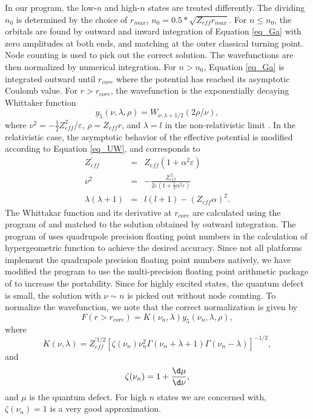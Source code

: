 \documentclass{elsart}
\begin{document}
In our program, the low-$n$ and high-$n$ states are treated differently.
The dividing $n_0$ is determined by the choice of $r_{max}$, $n_0 =
0.5*\sqrt{Z_{eff}r_{max}}$. For $n \le n_0$, the orbitals are found by outward
and inward integration of Equation \ref{eq_Ga} with zero amplitudes at both
ends, 
and matching at the outer classical turning point. Node counting is used to
pick out the correct solution. The wavefunctions are then normalized by
numerical integration. For $n > n_0$, Equation \ref{eq_Ga} is integrated
outward until $r_{core}$ where the potential has reached its asymptotic
Coulomb value. For $r > r_{core}$, the wavefunction is the exponentially
decaying Whittaker function 
\begin{equation}
y_5(\nu, \lambda, \rho) = W_{\nu, \lambda+1/2}(2\rho/\nu),
\end{equation}
where $\nu^2 = -\frac{1}{2}Z_{eff}^2/\varepsilon$, $\rho = Z_{eff}r$, and
$\lambda = l$ in the non-relativistic limit \citep{seaton58}. In the
relativistic case, the asymptotic behavior of the effective potential is
modified according to Equation \ref{eq_UW}, and corresponds to 
\begin{eqnarray}
Z_{eff}^\prime &=& Z_{eff}(1+\alpha^2\varepsilon) \nonumber\\
\nu^2 &=& -\frac{Z_{eff}^{\prime 2}}{2\varepsilon
\left(1+\frac{1}{2}\alpha^2\varepsilon\right)} \nonumber\\
\lambda(\lambda+1) &=& l(l+1) - (Z_{eff}\alpha)^2 .
\end{eqnarray}
The Whittakar function and its derivative at $r_{core}$ are calculated
using the program of \citet{thompson85} and matched to the solution obtained
by outward integration. The program of \citet{thompson85} uses
quadrupole precision floating point numbers in the calculation of 
hypergeometric function to achieve the desired accuracy. Since not all
platforms implement the quadrupole precision floating point numbers natively,
we have modified the program to use the multi-precision floating point
arithmetic package of \citet{bailey93} to increase the portability. Since for
highly excited states, the quantum defect is 
small, the solution with $\nu \sim n$ is picked out without node counting. To
normalize the wavefunction, we note that the correct normalization is given by
\citep{seaton58}
\begin{equation}
F(r > r_{core}) = K(\nu_n, \lambda)y_5(\nu_n, \lambda, \rho),
\end{equation}
where 
\begin{equation}
K(\nu,\lambda) =
Z_{eff}^{\prime 1/2}\left[\zeta(\nu_n)\nu_n^2\Gamma(\nu_n+\lambda+1)
\Gamma(\nu_n-\lambda)\right]^{-1/2}, 
\end{equation}
and 
\begin{equation}
\zeta(\nu_n) = 1 + \frac{\d\mu}{\d\nu},
\end{equation}
and $\mu$ is the quantum defect. For high $n$ states we are concerned with,
$\zeta(\nu_n) = 1$ is a very good approximation. 
\end{document}
